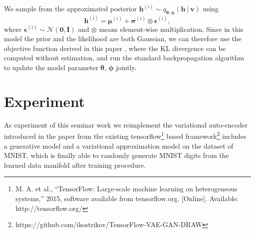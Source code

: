 \documentclass[conference]{IEEEtran}
\begin{document}
We sample from the approximated posterior $\boldsymbol{h}^{(i)}\sim q_{\boldsymbol{\theta}, \boldsymbol{\phi}}(\boldsymbol{h}\ |\ \boldsymbol{v})$ using 
\begin{equation}
\boldsymbol{h}^{(i)}=\boldsymbol{\mu}^{(i)}+\boldsymbol{\sigma}^{(i)}\otimes \boldsymbol{\epsilon}^{(i)},
\end{equation}
where $\boldsymbol{\epsilon}^{(i)}\sim \mathcal{N}(\boldsymbol{0}, \mathbf{I})$ and $\otimes$ means element-wise multiplication. Since in this model the prior and the likelihood are both Gaussian, we can therefore use the objective function derived in this paper \cite{kingma2013auto}, where the KL divergence can be computed without estimation, and run the standard backpropagation algorithm to update the model parameter $\boldsymbol{\theta}$, $\boldsymbol{\phi}$ jointly.
\section{Experiment}
As experiment of this seminar work we reimplement the variational auto-encoder introduced in the paper \cite{kingma2013auto} from the existing tensorflow\footnote{M. A. et al., “TensorFlow: Large-scale machine learning on heterogeneous
systems,” 2015, software available from tensorflow.org. [Online]. Available: http://tensorflow.org/} based framework\footnote{https://github.com/ikostrikov/TensorFlow-VAE-GAN-DRAW} includes a generative model and a variational approximation model on the dataset of MNIST, which is finally able to randomly generate MNIST digits from the learned data manifold after training procedure. 
\end{document}
